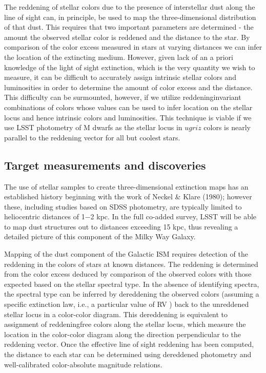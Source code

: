 The reddening of stellar colors due to the presence of interstellar dust along the line of sight can,
in principle, be used to map the three-dimensional distribution of that dust. This requires that
two important parameters are determined - the amount the observed stellar color is reddened and
the distance to the star. By comparison of the color excess measured in stars at varying distances
we can infer the location of the extincting medium. However, given lack of an a priori knowledge
of the light of sight extinction, which is the very quantity we wish to measure, it can be difficult
to accurately assign intrinsic stellar colors and luminosities in order to determine the amount of
color excess and the distance. This difficulty can be surmounted, however, if we utilize reddeninginvariant
combinations of colors whose values can be used to infer location on the stellar locus
and hence intrinsic colors and luminosities. This technique is viable if we use LSST photometry of
M dwarfs as the stellar locus in $ugriz$ colors is nearly parallel to the reddening vector for all but
coolest stars.



\subsection{Target measurements and discoveries}
\label{sec:\secname:targets}

The use of stellar samples to create three-dimensional extinction maps has an established history
beginning with the work of Neckel & Klare (1980); however these, including studies based on SDSS
photometry, are typically limited to heliocentric distances of 1−2 kpc. In the full co-added survey,
LSST will be able to map dust structures out to distances exceeding 15 kpc, thus revealing a
detailed picture of this component of the Milky Way Galaxy.

Mapping of the dust component of the Galactic ISM requires detection of the reddening in the
colors of stars at known distances. The reddening is determined from the color excess deduced
by comparison of the observed colors with those expected based on the stellar spectral type. In
the absence of identifying spectra, the spectral type can be inferred by dereddening the observed
colors (assuming a specific extinction law, i.e., a particular value of RV ) back to the unreddened
stellar locus in a color-color diagram. This dereddening is equivalent to assignment of reddeningfree
colors along the stellar locus, which measure the location in the color-color diagram along
the direction perpendicular to the reddening vector. Once the effective line of sight reddening has
been computed, the distance to each star can be determined using dereddened photometry and
well-calibrated color-absolute magnitude relations.

